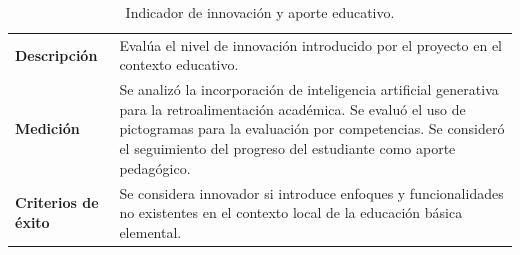 \begin{table}[H]
\centering
\caption{Indicador de innovación y aporte educativo.}
\label{tab:ind_innovacion}
\begin{tabularx}{\textwidth}{|L{3.5cm}|X|}
\hline
{}
 & \\
\hline
\textbf{Descripción} & Evalúa el nivel de innovación introducido por el proyecto en el contexto educativo.\\
\hline
\textbf{Medición} & Se analizó la incorporación de inteligencia artificial generativa para la retroalimentación académica. Se evaluó el uso de pictogramas para la evaluación por competencias. Se consideró el seguimiento del progreso del estudiante como aporte pedagógico.\\
\hline
\textbf{Criterios de éxito} & Se considera innovador si introduce enfoques y funcionalidades no existentes en el contexto local de la educación básica elemental.\\
\hline
\end{tabularx}
\fuenteautor
\end{table}
